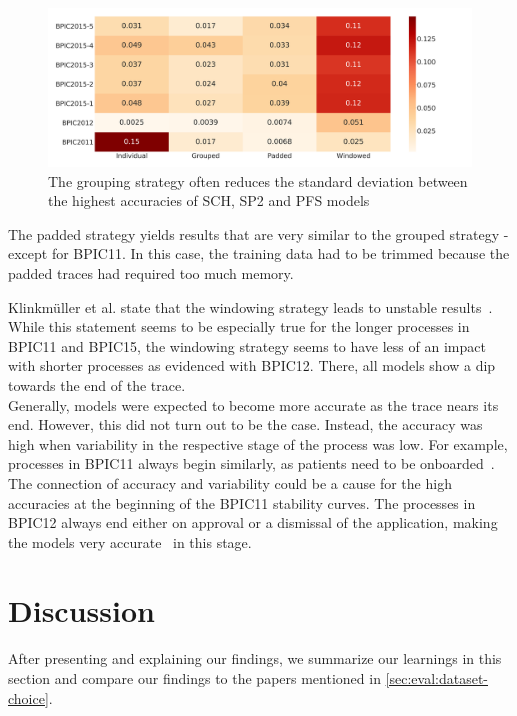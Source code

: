 \begin{figure}
    \centering
    \includegraphics[width=\textwidth]{gfx/grouping-accuracy-harmonization.pdf}
    \caption[Batching strategy harmonizes top accuracies]{The grouping strategy often reduces the standard deviation between the highest accuracies of SCH, SP2 and PFS models}
    \label{fig:grouping-accuracy-harmonization}
\end{figure}

The padded strategy yields results that are very similar to the grouped strategy - except for BPIC11. In this case, the training data had to be trimmed because the padded traces had required too much memory.

Klinkmüller et al. state that the windowing strategy leads to unstable results~\cite{klinkmuller2018reliablemonitoring}. While this statement seems to be especially true for the longer processes in BPIC11 and BPIC15, the windowing strategy seems to have less of an impact with shorter processes as evidenced with BPIC12. There, all models show a dip towards the end of the trace.\\

Generally, models were expected to become more accurate as the trace nears its end. However, this did not turn out to be the case. Instead, the accuracy was high when variability in the respective stage of the process was low. For example, processes in BPIC11 always begin similarly, as patients need to be onboarded~\cite{bose2011analysis}. The connection of accuracy and variability could be a cause for the high accuracies at the beginning of the BPIC11 stability curves. The processes in BPIC12 always end either on approval or a dismissal of the application, making the models very accurate~\cite{adriansyah2012mining} in this stage.

\section{Discussion}\label{sec:eval:discussion}
After presenting and explaining our findings, we summarize our learnings in this section and compare our findings to the papers mentioned in \autoref{sec:eval:dataset-choice}.\\

